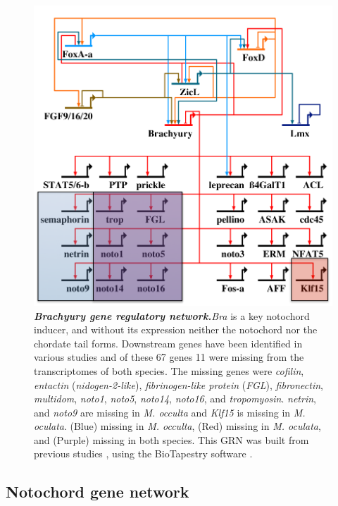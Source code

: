 \begin{figure}[tbp]
\centering
\includegraphics[scale=0.8]{figures/bra_grn.pdf}
\caption{\textbf{\textit{Brachyury gene regulatory network.}}\textit{Bra} is a key notochord inducer, and without its expression neither the notochord nor the chordate tail forms. Downstream genes have been identified in various studies and of these 67 genes 11 were missing from the transcriptomes of both species. The missing genes were \textit{cofilin}, \textit{entactin} (\textit{nidogen-2-like}), \textit{fibrinogen-like protein} (\textit{FGL}), \textit{fibronectin}, \textit{multidom}, \textit{noto1}, \textit{noto5}, \textit{noto14}, \textit{noto16}, and \textit{tropomyosin}. \textit{netrin}, and \textit{noto9} are missing in \textit{M. occulta} and \textit{Klf15} is missing in \textit{M. oculata}. (Blue) missing in \textit{M. occulta}, (Red) missing in \textit{M. oculata}, and (Purple) missing in both species. This GRN was built from previous studies  \cite{hotta_temporal_1999,hotta_characterization_2000,hotta_brachyury-downstream_2007,kugler_evolutionary_2008,kugler_evolutionary_2011}, using the BioTapestry software \cite{longabaugh_visualization_2009}.}
\label{fig:bra_grn}
\end{figure}
\subsection{Notochord gene network}


